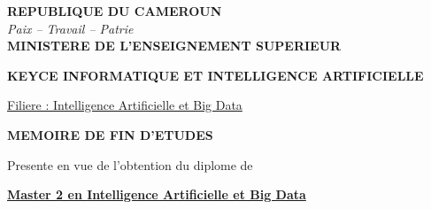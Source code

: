 \documentclass[12pt,a4paper,twoside,openany]{report}
\begin{document}
\setcounter{page}{1}


\begin{titlepage}
\begin{center}

\noindent
\begin{minipage}[t]{0.35\textwidth}
\raggedright
{}
\end{minipage}%
\hfill
\begin{minipage}[t]{0.55\textwidth}
\raggedleft
\textbf{REPUBLIQUE DU CAMEROUN}\\
\textit{Paix -- Travail -- Patrie}\\[0.3cm]
\textbf{MINISTERE DE L'ENSEIGNEMENT SUPERIEUR}
\end{minipage}

\vspace{2cm}

{\Large \textbf{KEYCE INFORMATIQUE ET INTELLIGENCE ARTIFICIELLE}}

\vspace{0.3cm}

\underline{Filiere : Intelligence Artificielle et Big Data}

\vspace{1.5cm}

{\LARGE \textbf{MEMOIRE DE FIN D'ETUDES}}

\vspace{0.5cm}

Presente en vue de l'obtention du diplome de

\vspace{0.3cm}

{\Large \textbf{\underline{Master 2 en Intelligence Artificielle et Big Data}}}

\vspace{1.5cm}

\end{center}
\end{titlepage}
\end{document}

